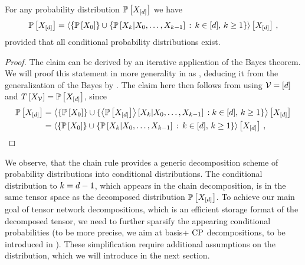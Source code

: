 \begin{theorem}
    \label{the:chainRule}
    For any probability distribution $\mathbb{P}\left[X_{[d]}\right]$ we have
    \begin{align*}
        \mathbb{P}\left[X_{[d]}\right]
        = \left\langle \{\mathbb{P}\left[X_{0}\right]\} \cup
        \left\{\mathbb{P}\left[X_{k}|X_{0},\ldots,X_{k-1}\right]\,:\,k\in[d], \, k\geq 1\right\}
        \right\rangle \left[ X_{[d]} \right] \, ,
    \end{align*}
    provided that all conditional probability distributions exist.
\end{theorem}
\begin{proof}
    The claim can be derived by an iterative application of the Bayes  theorem.
    We will proof this statement in more generality in  as , deducing it from the generalization of the Bayes  by .
    The claim here then follows from  using $\mathcal{V}=[d]$ and $T\left[X_{\mathcal{V}}\right]=\mathbb{P}\left[X_{[d]}\right]$, since
    \begin{align*}
        \mathbb{P}\left[X_{[d]}\right]
        &= \left\langle \{\mathbb{P}\left[X_{0}\right]\} \cup
        \{\left\langle \mathbb{P}\left[X_{[d]}\right]\right\rangle \left[ X_{k} | X_{0},\ldots,X_{k-1} \right]  \, : k\in[d], \, k\geq 1\}
        \right\rangle \left[ X_{[d]} \right] \\
        &  = \left\langle \{\mathbb{P}\left[X_{0}\right]\} \cup
        \left\{\mathbb{P}\left[X_{k}|X_{0},\ldots,X_{k-1}\right]\,:\,k\in[d], \, k\geq 1\right\}
        \right\rangle \left[ X_{[d]} \right] \, ,
    \end{align*}
\end{proof}

We observe, that the chain rule provides a generic decomposition scheme of probability distributions into conditional distributions.
The conditional distribution to $k=d-1$, which appears in the chain decomposition, is in the same tensor space as the decomposed distribution $\mathbb{P}\left[X_{[d]}\right]$.
To achieve our main goal of tensor network decompositions, which is an efficient storage format of the decomposed tensor, we need to further sparsify the appearing conditional probabilities (to be more precise, we aim at basis+ $\mathrm{CP}$ decompositions, to be introduced in ).
These simplification require additional assumptions on the distribution, which we will introduce in the next section.


